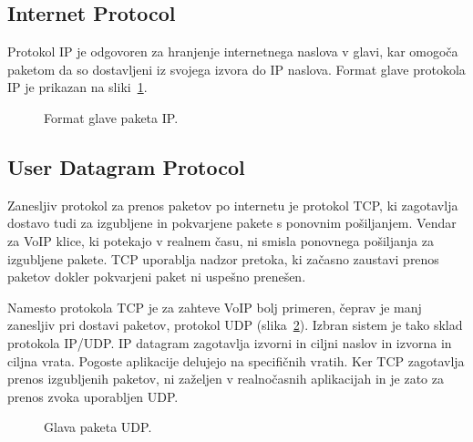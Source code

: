 \documentclass{acm_proc_article-sp}
\begin{document}
\subsection{Internet Protocol}

Protokol IP je odgovoren za hranjenje internetnega naslova v glavi, kar omogoča paketom da so dostavljeni iz svojega izvora do IP naslova. Format glave protokola IP je prikazan na sliki~\ref{fig:ip}.

\begin{figure}
\centering
{} %
\caption{Format glave paketa IP.}
\label{fig:ip}
\end{figure}


\subsection{User Datagram Protocol}
Zanesljiv protokol za prenos paketov po internetu je protokol TCP, ki zagotavlja dostavo tudi za izgubljene in pokvarjene pakete s ponovnim pošiljanjem. Vendar za VoIP klice, ki potekajo v realnem času, ni smisla ponovnega pošiljanja za izgubljene pakete. TCP uporablja nadzor pretoka, ki začasno zaustavi prenos paketov dokler pokvarjeni paket ni uspešno prenešen.

Namesto protokola TCP je za zahteve VoIP bolj primeren, čeprav je manj zanesljiv pri dostavi paketov, protokol UDP (slika~\ref{fig:udp}). Izbran sistem je tako sklad protokola IP/UDP. IP datagram zagotavlja izvorni in ciljni naslov in izvorna in ciljna vrata. Pogoste aplikacije delujejo na specifičnih vratih. Ker TCP zagotavlja prenos izgubljenih paketov, ni zaželjen v realnočasnih aplikacijah in je zato za prenos zvoka uporabljen UDP.

\begin{figure}
\centering
{} %
\caption{Glava paketa UDP.}
\label{fig:udp}
\end{figure}
\end{document}
